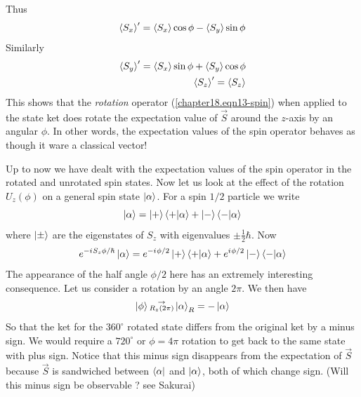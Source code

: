 Thus
\begin{equation}
\expval{S_x}^\prime = \expval{S_x} \cos\phi - \expval{S_y}\sin\phi
\end{equation}
Similarly
\begin{align}
\label{chapter18.eqn15-spin}
\expval{S_y}^\prime = \expval{S_x} \sin\phi + \expval{S_y}\cos\phi \\
\expval{S_z}^\prime = \expval{S_z}
\end{align}
This shows that the \textit{rotation} operator (\ref{chapter18.eqn13-spin}) when applied to the state ket does rotate the expectation value of $\vec{S}$ around the $z$-axis by an angular $\phi$. In other words, the expectation values of the spin operator behaves as though it ware a classical vector!

Up to now we have dealt with the expectation values of the spin operator in the rotated and unrotated spin states. Now let us look at the effect of the rotation $U_z(\phi)$ on a general spin state $\ket{\alpha}$. For a spin $1/2$ particle we write
\begin{equation}
\label{chapter18.eqn16-spin}
\ket{\alpha} = \ket{+} \braket{+}{\alpha} + \ket{-} \braket{-}{\alpha}
\end{equation}
where $\ket{\pm}$ are the eigenstates of $S_z$ with eigenvalues $\pm \frac{1}{2} \hbar$. Now
\begin{equation}
e^{-{i\mkern1mu} S_z \phi/\hbar} \ket{\alpha} = e^{-{i\mkern1mu} \phi/2} \ket{+} \braket{+}{\alpha} + e^{{i\mkern1mu} \phi/2} \ket{-} \braket{-}{\alpha}
\end{equation}
The appearance of the half angle $\phi/2$ here has an extremely interesting consequence. Let us consider a rotation by an angle $2\pi$. We then have
\begin{equation}
\label{chapter18.eqn17-spin}
\ket{\phi} \substack{\rightarrow \\ R_z(2 \pi)} \ket{\alpha}_R = - \ket{\alpha}
\end{equation}
So that the ket for the $360^\circ$ rotated state differs from the original ket by a minus sign. We would require a $720^\circ$ or $\phi=4 \pi$ rotation to get back to the same state with plus sign. Notice that this minus sign disappears from the expectation of $\vec{S}$ because $\vec{S}$ is sandwiched between $\bra{\alpha}$ and $\ket{\alpha}$, both of which change sign. (Will this minus sign be observable ? see Sakurai)



